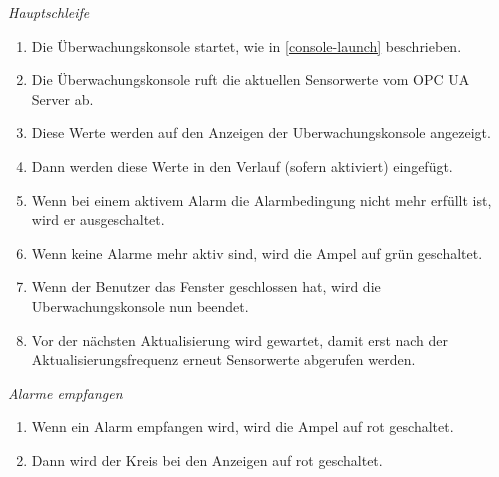 \documentclass[parskip=full]{scrartcl}
\begin{document}
\emph{Hauptschleife}
\begin{enumerate}[noitemsep]
 \item Die Überwachungskonsole startet, wie in \ref{console-launch} beschrieben.
 \item Die Überwachungskonsole ruft die aktuellen Sensorwerte vom \gls{OPC UA Server} ab.
 \item Diese Werte werden auf den Anzeigen der \gls{Uberwachungskonsole} angezeigt.
 \item Dann werden diese Werte in den Verlauf (sofern aktiviert) eingefügt.
 \item Wenn bei einem aktivem Alarm die Alarmbedingung nicht mehr erfüllt ist, wird er ausgeschaltet.
 \item Wenn keine Alarme mehr aktiv sind, wird die Ampel auf grün geschaltet.
 \item Wenn der Benutzer das Fenster geschlossen hat, wird die \gls{Uberwachungskonsole} nun beendet.
 \item Vor der nächsten Aktualisierung wird gewartet, damit erst nach der Aktualisierungsfrequenz erneut Sensorwerte abgerufen werden.
\end{enumerate}
\emph{Alarme empfangen}
\begin{enumerate}[noitemsep]
 \item Wenn ein Alarm empfangen wird, wird die Ampel auf rot geschaltet.
 \item Dann wird der Kreis bei den Anzeigen auf rot geschaltet.
\end{enumerate}
\end{document}

